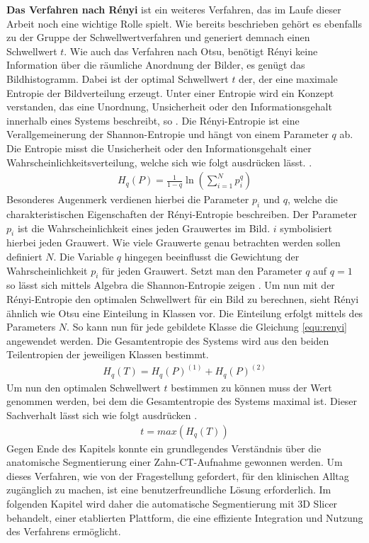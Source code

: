 \textbf{Das Verfahren nach Rényi} ist ein weiteres Verfahren, das im Laufe
dieser Arbeit noch eine wichtige Rolle spielt. Wie bereits beschrieben gehört es
ebenfalls zu der Gruppe der Schwellwertverfahren und generiert demnach einen Schwellwert
$t$. Wie auch das Verfahren nach Otsu, benötigt Rényi keine Information über die
räumliche Anordnung der Bilder, es genügt das Bildhistogramm. Dabei ist der optimal
Schwellwert $t$ der, der eine maximale Entropie der Bildverteilung erzeugt. Unter
einer Entropie wird ein Konzept verstanden, das eine Unordnung, Unsicherheit oder
den Informationsgehalt innerhalb eines Systems beschreibt, so \citet[S.~102]{bein2006}.
Die Rényi-Entropie ist eine Verallgemeinerung der Shannon-Entropie und hängt von
einem Parameter $q$ ab. Die Entropie misst die Unsicherheit oder den Informationsgehalt
einer Wahrscheinlichkeitsverteilung, welche sich wie folgt ausdrücken lässt. \citep[vgl.][K.~2]{bromiley2004}.
\begin{align}
	\label{equ:renyi}H_{q}(P) = \frac{1}{1-q}\ln \left( \sum_{i=1}^{N}p_{i}^{q}\right)
\end{align}
Besonderes Augenmerk verdienen hierbei die Parameter $p_{i}$ und $q$, welche die
charakteristischen Eigenschaften der Rényi-Entropie beschreiben. Der Parameter $p
_{i}$ ist die Wahrscheinlichkeit eines jeden Grauwertes im Bild. $i$
symbolisiert hierbei jeden Grauwert. Wie viele Grauwerte genau betrachten werden
sollen definiert $N$. Die Variable $q$ hingegen beeinflusst die Gewichtung der
Wahrscheinlichkeit $p_{i}$ für jeden Grauwert. Setzt man den Parameter $q$ auf $q
= 1$ so lässt sich mittels Algebra die Shannon-Entropie zeigen \citep[vgl.][K.~2]{bromiley2004}.
Um nun mit der Rényi-Entropie den optimalen Schwellwert für ein Bild zu berechnen,
sieht Rényi ähnlich wie Otsu eine Einteilung in Klassen vor. Die Einteilung erfolgt
mittels des Parameters $N$. So kann nun für jede gebildete Klasse die Gleichung
\ref{equ:renyi} angewendet werden. Die Gesamtentropie des Systems wird aus den beiden
Teilentropien der jeweiligen Klassen bestimmt\citep[vgl.][K.~2]{bromiley2004}.
\begin{align}
	H_{q}(T) = H_{q}(P)^{(1)}+ H_{q}(P)^{(2)}
\end{align}
Um nun den optimalen Schwellwert $t$ bestimmen zu können muss der Wert genommen
werden, bei dem die Gesamtentropie des Systems maximal ist. Dieser Sachverhalt
lässt sich wie folgt ausdrücken \citep[vgl.][K.~2]{bromiley2004}.
\begin{align}
	t = max(H_{q}(T))
\end{align}
Gegen Ende des Kapitels konnte ein grundlegendes Verständnis über die
anatomische Segmentierung einer Zahn-\ac{CT}-Aufnahme gewonnen werden. Um dieses
Verfahren, wie von der Fragestellung gefordert, für den klinischen Alltag
zugänglich zu machen, ist eine benutzerfreundliche Lösung erforderlich. Im
folgenden Kapitel wird daher die automatische Segmentierung mit 3D Slicer
behandelt, einer etablierten Plattform, die eine effiziente Integration und
Nutzung des Verfahrens ermöglicht.
